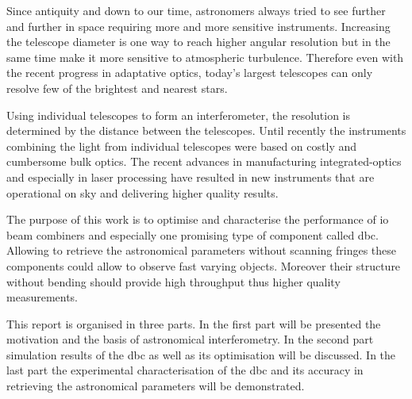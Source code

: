 Since antiquity and down to our time, astronomers always tried to see further and further in space requiring more and more sensitive instruments. Increasing the telescope diameter is one way to reach higher angular resolution but in the same time make it more sensitive to atmospheric turbulence. Therefore even with the recent progress in adaptative optics, today's largest telescopes can only resolve few of the brightest and nearest stars. 

Using individual telescopes to form an interferometer, the resolution is determined by the distance between the telescopes. Until recently the instruments combining the light from individual telescopes were based on costly and cumbersome bulk optics. The recent advances in manufacturing integrated-optics and especially in laser processing have resulted in new instruments that are operational on sky and delivering higher quality results. 

The purpose of this work is to optimise and characterise the performance of \gls{io} beam combiners and especially one promising type of component called \gls{dbc}. Allowing to retrieve the astronomical parameters without scanning fringes these components could allow to observe fast varying objects. Moreover their structure without bending should provide high throughput thus higher quality measurements. 

This report is organised in three parts. In the first part will be presented the motivation and the basis of astronomical interferometry. In the second part simulation results of the \gls{dbc} as well as its optimisation will be discussed. In the last part the experimental characterisation of the \gls{dbc} and its accuracy in retrieving the astronomical parameters will be demonstrated.
